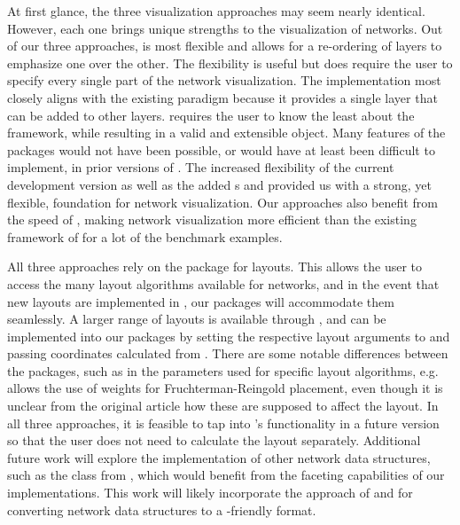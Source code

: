 At first  glance, the three visualization approaches may seem nearly identical. However, each one brings unique strengths to the visualization of networks.  Out of our three approaches,  is most flexible and allows for a re-ordering of layers to emphasize one over the other. The flexibility is useful but does require the user to specify every single part of the network visualization. The  implementation most closely aligns with the existing  paradigm because it provides a single layer that can be added to other  layers.  requires the user to know the least about the  framework, while resulting in a valid and extensible  object. Many features of the packages would not have been possible, or would have at least been difficult to implement, in  prior versions of .  The increased flexibility of the current development version as well as the added s  and  provided us with a strong, yet flexible, foundation for network visualization. Our approaches also benefit from the speed of ,  making network visualization more efficient than the existing framework of  for a lot of the benchmark examples.

All three approaches rely on the package  for layouts. This allows the user to access the many layout algorithms available for networks, and in the event that new layouts are implemented in , our packages will accommodate them seamlessly. A larger range of layouts is available through , and can be implemented into our packages by setting the respective layout arguments to  and passing  coordinates calculated from . There are some notable differences between the packages, such as in the parameters used for specific layout algorithms, e.g.\  allows the use of weights for Fruchterman-Reingold placement, even though it is unclear from the original article how these are supposed to affect the layout. In all  three approaches, it is  feasible to tap into 's functionality in a future version so that the user does not need to calculate the layout separately. Additional future work will explore the implementation of other network data structures, such as the  class from , which would benefit from the faceting capabilities of our implementations. This work will likely incorporate the  approach of  and  for converting network data structures to a -friendly format.

